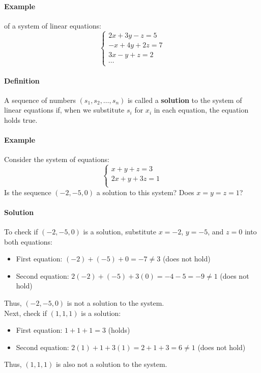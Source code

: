 \paragraph*{Example} of a system of linear equations:
\[\begin{cases}
2x + 3y - z = 5 \\
-x + 4y + 2z = 7 \\
3x - y + z = 2 \\
\cdots
\end{cases}\]

\paragraph*{Definition} A sequence of numbers $(s_1, s_2, \ldots, s_n)$ is called a \textbf{solution} to the system of linear equations if, when we substitute $s_i$ for $x_i$ in each equation, the equation holds true.

\paragraph*{Example} Consider the system of equations:
\[\begin{cases}
    x + y + z = 3 \\
    2x + y + 3z = 1 \\
\end{cases}\]
Is the sequence $(-2, -5, 0)$ a solution to this system? Does $x = y = z = 1$?
\paragraph*{Solution} To check if $(-2, -5, 0)$ is a solution, substitute $x = -2$, $y = -5$, and $z = 0$ into both equations:
\begin{itemize}
    \item First equation: $(-2) + (-5) + 0 = -7 \neq 3$ (does not hold)
    \item Second equation: $2(-2) + (-5) + 3(0) = -4 - 5 = -9 \neq 1$ (does not hold)
\end{itemize}
Thus, $(-2, -5, 0)$ is not a solution to the system. \\
Next, check if $(1, 1, 1)$ is a solution:
\begin{itemize}
    \item First equation: $1 + 1 + 1 = 3$ (holds)
    \item Second equation: $2(1) + 1 + 3(1) = 2 + 1 + 3 = 6 \neq 1$ (does not hold)
\end{itemize}
Thus, $(1, 1, 1)$ is also not a solution to the system.

